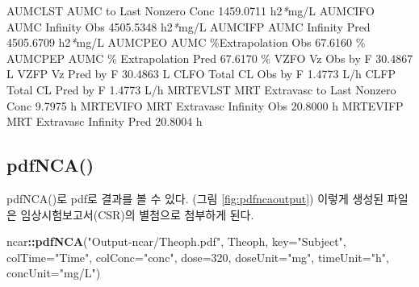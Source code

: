 \documentclass[
  11pt,
  krantz2, a4paper, twoside]{krantz}
\newenvironment{Shaded}{\begin{snugshade}}{\end{snugshade}}
\newcommand{\AttributeTok}[1]{\textcolor[rgb]{0.13,0.29,0.53}{#1}}
\newcommand{\DecValTok}[1]{\textcolor[rgb]{0.00,0.00,0.81}{#1}}
\newcommand{\ExtensionTok}[1]{#1}
\newcommand{\FunctionTok}[1]{\textcolor[rgb]{0.13,0.29,0.53}{\textbf{#1}}}
\newcommand{\NormalTok}[1]{#1}
\newcommand{\PreprocessorTok}[1]{\textcolor[rgb]{0.56,0.35,0.01}{\textit{#1}}}
\newcommand{\SpecialCharTok}[1]{\textcolor[rgb]{0.81,0.36,0.00}{\textbf{#1}}}
\newcommand{\StringTok}[1]{\textcolor[rgb]{0.31,0.60,0.02}{#1}}
\theoremstyle{definition}
\theoremstyle{definition}
\theoremstyle{definition}
\theoremstyle{definition}
\theoremstyle{remark}
\begin{document}
\begin{Shaded}
\begin{Highlighting}[]
\ExtensionTok{AUMCLST}\NormalTok{    AUMC to Last Nonzero Conc                    1459.0711 h2}\PreprocessorTok{*}\NormalTok{mg/L}
\ExtensionTok{AUMCIFO}\NormalTok{    AUMC Infinity Obs                            4505.5348 h2}\PreprocessorTok{*}\NormalTok{mg/L}
\ExtensionTok{AUMCIFP}\NormalTok{    AUMC Infinity Pred                           4505.6709 h2}\PreprocessorTok{*}\NormalTok{mg/L}
\ExtensionTok{AUMCPEO}\NormalTok{    AUMC \%Extrapolation Obs                        67.6160 \%}
\ExtensionTok{AUMCPEP}\NormalTok{    AUMC \% Extrapolation Pred                      67.6170 \%}
\ExtensionTok{VZFO}\NormalTok{       Vz Obs by F                                    30.4867 L}
\ExtensionTok{VZFP}\NormalTok{       Vz Pred by F                                   30.4863 L}
\ExtensionTok{CLFO}\NormalTok{       Total CL Obs by F                               1.4773 L/h}
\ExtensionTok{CLFP}\NormalTok{       Total CL Pred by F                              1.4773 L/h}
\ExtensionTok{MRTEVLST}\NormalTok{   MRT Extravasc to Last Nonzero Conc              9.7975 h}
\ExtensionTok{MRTEVIFO}\NormalTok{   MRT Extravasc Infinity Obs                     20.8000 h}
\ExtensionTok{MRTEVIFP}\NormalTok{   MRT Extravasc Infinity Pred                    20.8004 h}
\end{Highlighting}
\end{Shaded}

\normalsize

\subsection{pdfNCA()}\label{pdfnca}

pdfNCA()로 pdf로 결과를 볼 수 있다. (그림 \ref{fig:pdfncaoutput}) 이렇게 생성된 파일은 임상시험보고서(CSR)의 별첨으로 첨부하게 된다.

\begin{Shaded}
\begin{Highlighting}[]
\NormalTok{ncar}\SpecialCharTok{::}\FunctionTok{pdfNCA}\NormalTok{(}\StringTok{"Output{-}ncar/Theoph.pdf"}\NormalTok{, Theoph, }\AttributeTok{key=}\StringTok{"Subject"}\NormalTok{, }
             \AttributeTok{colTime=}\StringTok{"Time"}\NormalTok{,  }\AttributeTok{colConc=}\StringTok{"conc"}\NormalTok{, }\AttributeTok{dose=}\DecValTok{320}\NormalTok{, }\AttributeTok{doseUnit=}\StringTok{"mg"}\NormalTok{, }
             \AttributeTok{timeUnit=}\StringTok{"h"}\NormalTok{, }\AttributeTok{concUnit=}\StringTok{"mg/L"}\NormalTok{)}
\end{Highlighting}
\end{Shaded}
\end{document}
